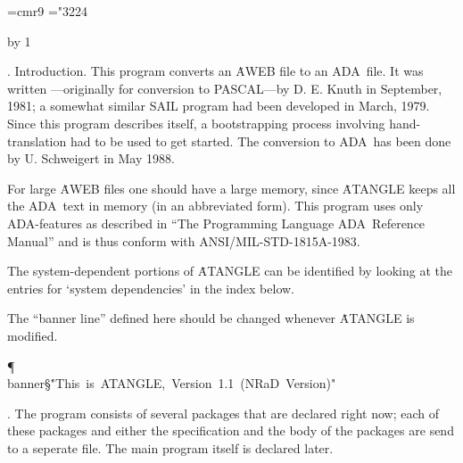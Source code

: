 


\def\hang{\hangindent 3em\indent\ignorespaces}
\font\ninerm=cmr9
\let\mc=\ninerm %
\def\ADA{{\mc ADA}}
\def\ab{$\.|\ldots\.|$} %
\def\v{\.{\char'174}} %
\mathchardef\BA="3224 %
\def\({} %

\def\title{ATANGLE}
\def\contentspagenumber{137} %
\def\topofcontents{\null\vfill
  \titlefalse %
  \def\rheader{\mainfont Appendix E\hfil \contentspagenumber}
  \centerline{\titlefont The {\ttitlefont ATANGLE} processor}
  \vskip 15pt
  \centerline{(based on {\tt TANGLE} Version 2.8)}
  \centerline{{\ninerm[ADA-Version 1.0]}}
  \vfill}
\pageno=\contentspagenumber \advance\pageno by 1


\*.  Introduction.
This program converts an \.{AWEB} file to an \ADA\ file. It was written%
---originally for conversion to {\mc PASCAL}---by D. E. Knuth in September,
1981; a somewhat similar {\mc SAIL} program had been developed in March,
1979. Since this program describes itself, a bootstrapping process involving
hand-translation had to be used to get started. The conversion to \ADA\
has been done by U. Schweigert in May 1988.

For large \.{AWEB} files one should have a large memory, since \.{ATANGLE}
keeps all the \ADA\ text in memory (in an abbreviated form). This program
uses only \ADA-features as described in ``The Programming Language \ADA\
Reference Manual'' and is thus conform with ANSI/MIL-STD-1815A-1983.

The system-dependent portions of \.{ATANGLE} can be identified by looking at
the entries for `system dependencies' in the index below.

The ``banner line'' defined here should be changed whenever \.{ATANGLE} is
modified.

\Y\P\4\D\\{banner}\?\S\?\.{"This\ is\ ATANGLE,\ Version\ 1.1\ (NRaD\ Version)"}%
\?\6
\?\par
\fi

. The program consists of several packages that are declared right now;
each of these packages and either the specification and the body of
the packages are send to a seperate file. The main program itself
is declared later.

